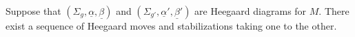

    Suppose that $(\Sigma_g,\underline \alpha, \underline \beta)$ and $(\Sigma_{g'},\underline \alpha', \underline \beta')$ are Heegaard diagrams for $M$. There exist a sequence of Heegaard moves and stabilizations taking one to the other. 
